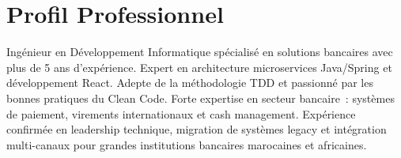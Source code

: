 \section*{Profil Professionnel}

Ingénieur en Développement Informatique spécialisé en solutions bancaires avec plus de 5 ans
d'expérience. Expert en architecture microservices Java/Spring et développement React. Adepte
de la méthodologie TDD et passionné par les bonnes pratiques du Clean Code. Forte expertise en
secteur bancaire~: systèmes de paiement, virements internationaux et cash management. Expérience
confirmée en leadership technique, migration de systèmes legacy et intégration multi-canaux pour
grandes institutions bancaires marocaines et africaines.
